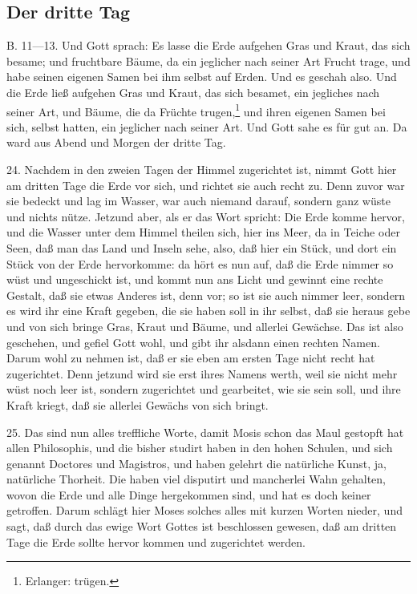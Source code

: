 \subsection{Der dritte Tag}

B. 11—13. Und Gott sprach: Es lasse die Erde aufgehen Gras und Kraut, das sich besame; und fruchtbare Bäume, da ein jeglicher
nach seiner Art Frucht trage, und habe seinen eigenen Samen bei ihm selbst auf Erden. Und es geschah also. Und die Erde ließ aufgehen Gras und Kraut, das sich besamet, ein jegliches nach seiner Art, und Bäume, die da Früchte trugen,\footnote{Erlanger: trügen.} und ihren eigenen Samen bei sich, selbst hatten, ein jeglicher nach seiner Art. Und Gott sahe es für gut an. Da ward aus Abend und Morgen der dritte Tag.

24. Nachdem in den zweien Tagen der Himmel zugerichtet ist, nimmt Gott hier am dritten Tage die Erde vor sich, und richtet sie auch recht zu. Denn zuvor war sie bedeckt und lag im Wasser, war auch niemand darauf, sondern ganz wüste und nichts nütze. Jetzund aber, als er das Wort spricht: Die Erde komme hervor, und die Wasser unter dem Himmel theilen sich, hier ins Meer, da in Teiche oder Seen, daß man das Land und Inseln sehe, also, daß hier ein Stück, und dort ein Stück von der Erde hervorkomme: da hört es nun auf, daß die Erde nimmer so wüst und ungeschickt ist, und kommt nun ans Licht und gewinnt eine rechte Gestalt, daß sie etwas Anderes ist, denn vor; so ist sie auch nimmer leer, sondern es wird ihr eine Kraft gegeben, die sie haben soll in ihr selbst, daß sie heraus gebe und von sich bringe Gras, Kraut und Bäume, und allerlei Gewächse. Das ist also geschehen, und gefiel Gott wohl, und gibt ihr alsdann einen rechten Namen. Darum wohl zu nehmen ist, daß er sie eben am ersten Tage nicht recht hat zugerichtet. Denn jetzund wird sie erst ihres Namens werth, weil sie nicht mehr wüst noch leer ist, sondern zugerichtet und gearbeitet, wie sie sein soll, und ihre Kraft kriegt, daß sie allerlei Gewächs von sich bringt.

25. Das sind nun alles treffliche Worte, damit Mosis schon das Maul gestopft hat allen Philosophis, und die bisher studirt haben in den hohen Schulen, und sich genannt Doctores und Magistros, und haben gelehrt die natürliche Kunst, ja, natürliche Thorheit. Die haben viel disputirt und mancherlei Wahn gehalten, wovon die Erde und alle Dinge hergekommen sind, und hat es doch keiner getroffen. Darum schlägt hier Moses solches alles mit kurzen Worten nieder, und sagt, daß durch das ewige Wort Gottes ist beschlossen gewesen, daß am dritten Tage die Erde sollte hervor kommen und zugerichtet werden.

